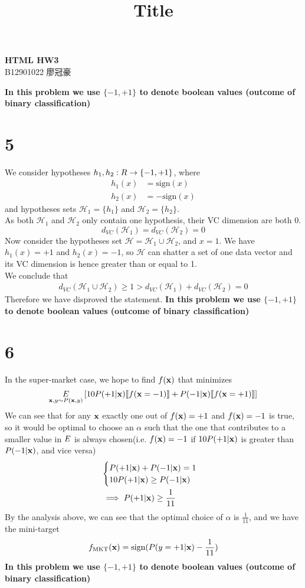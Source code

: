 \documentclass[11pt]{article}
\let\mathbb\relax
\theoremstyle{definition}
\begin{document}
\setcounter{section}{0}
\title{Title}

\thispagestyle{empty}
\begin{center}
  {\large \bf HTML HW3} \\ 
  B12901022 廖冠豪
\end{center}
\large{\textbf{In this problem we use $\{-1, +1\}$ to denote boolean values (outcome of binary classification)}}
\section*{5}
We consider hypotheses $h_1, h_2: \mathbb{R}\rightarrow\{-1, +1\}$, where 
\begin{align*}
  h_1(x) &= \text{sign}(x) \\
  h_2(x) &= -\text{sign}(x)
\end{align*}
and hypotheses sets $\mathcal{H}_1 = \{h_1\}$ and $\mathcal{H}_2 = \{h_2\}$. \\ 
As both $\mathcal{H}_1$ and $\mathcal{H}_2$ only contain one hypothesis, their VC dimension are both $0$.
\[
  d_{VC}(\mathcal{H}_1) = d_{VC}(\mathcal{H}_2) = 0
\]
Now consider the hypotheses set $\mathcal{H} = \mathcal{H}_1\cup\mathcal{H}_2$, and $x = 1$. We have $h_1(x) = +1$ and $h_2(x) = -1$, so $\mathcal{H}$ can shatter a set of one data vector and its VC dimension is hence greater than or equal to 1. \\ 
We conclude that
\begin{align*}
  d_{VC}(\mathcal{H}_1\cup\mathcal{H}_2)\geq1>d_{VC}(\mathcal{H}_1) + d_{VC}(\mathcal{H}_2) = 0
\end{align*}
Therefore we have disproved the statement.
\newpage
\large{\textbf{In this problem we use $\{-1, +1\}$ to denote boolean values (outcome of binary classification)}}
\section*{6}
In the super-market case, we hope to find $f(\vb{x})$ that minimizes
\[
  \underset{\vb{x}, y\sim P(\vb{x}, y)}{\mathbb{E}}\left[10P(+1|\vb{x})\llbracket f(\vb{x} = -1)\rrbracket+ P(-1|\vb{x})\llbracket f(\vb{x} = +1)\rrbracket \right]
\]
We can see that for any $\vb{x}$ exactly one out of $f(\vb{x}) = +1$ and $f(\vb{x}) = -1$ is true, so it would be optimal to choose an $\alpha$ such that the one that contributes to a smaller value in $\mathbb{E}$ is always chosen(i.e. $f(\vb{x})= -1$ if $10P(+1|\vb{x})$ is greater than $P(-1|\vb{x})$, and vice versa) \\
\begin{align*}
  &\begin{cases}
    P(+1|\vb{x}) + P(-1|\vb{x}) = 1 \\ 
    10P(+1|\vb{x}) \geq P(-1|\vb{x}) \\ 
  \end{cases} \\ 
  &\implies P(+1|\vb{x}) \geq \frac{1}{11}
\end{align*}
By the analysis above, we can see that the optimal choice of $\alpha$ is $\frac{1}{11}$, and we have the mini-target
\[
  f_{\text{MKT}}(\vb{x}) = \text{sign}(P(y = +1|\vb{x}) - \frac{1}{11})
\]
\newpage
\large{\textbf{In this problem we use $\{-1, +1\}$ to denote boolean values (outcome of binary classification)}}
\end{document}
